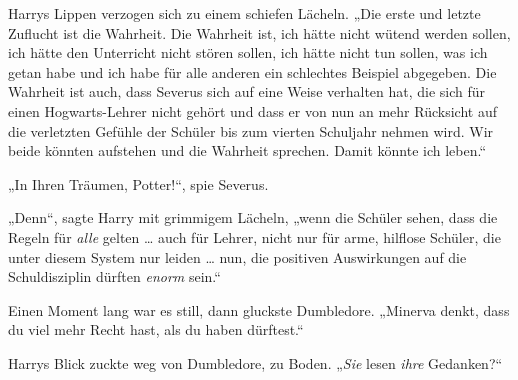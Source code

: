 Harrys Lippen verzogen sich zu einem schiefen Lächeln.
„Die erste und letzte Zuflucht ist die Wahrheit. Die Wahrheit ist, ich hätte nicht wütend werden sollen, ich hätte den Unterricht nicht stören sollen, ich hätte nicht tun sollen, was ich getan habe und ich habe für alle anderen ein schlechtes Beispiel abgegeben. Die Wahrheit ist auch, dass Severus sich auf eine Weise verhalten hat, die sich für einen Hogwarts-Lehrer nicht gehört und dass er von nun an mehr Rücksicht auf die verletzten Gefühle der Schüler bis zum vierten Schuljahr nehmen wird. Wir beide könnten aufstehen und die Wahrheit sprechen. Damit könnte ich leben.“

„In Ihren Träumen, Potter!“, spie Severus.

„Denn“, sagte Harry mit grimmigem Lächeln, „wenn die Schüler sehen, dass die Regeln für \emph{alle} gelten … auch für Lehrer, nicht nur für arme, hilflose Schüler, die unter diesem System nur leiden … nun, die positiven Auswirkungen auf die Schuldisziplin dürften \emph{enorm} sein.“

Einen Moment lang war es still, dann gluckste Dumbledore.
„Minerva denkt, dass du viel mehr Recht hast, als du haben dürftest.“

Harrys Blick zuckte weg von Dumbledore, zu Boden.
„\emph{Sie} lesen \emph{ihre} Gedanken?“

